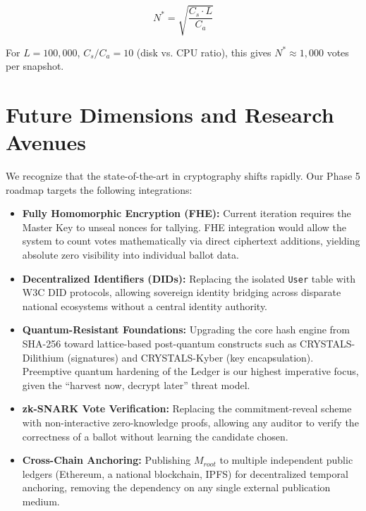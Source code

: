 \documentclass[journal,10pt,twocolumn]{IEEEtran}
\begin{document}
\begin{equation}
    N^* = \sqrt{\frac{C_s \cdot L}{C_a}}
\end{equation}

For $L = 100,000$, $C_s/C_a = 10$ (disk vs. CPU ratio), this gives $N^* \approx 1,000$ votes per snapshot.

\section{Future Dimensions and Research Avenues}

We recognize that the state-of-the-art in cryptography shifts rapidly. Our Phase 5 roadmap targets the following integrations:

\begin{itemize}
    \item \textbf{Fully Homomorphic Encryption (FHE):} Current iteration requires the Master Key to unseal nonces for tallying. FHE integration would allow the system to count votes mathematically via direct ciphertext additions, yielding absolute zero visibility into individual ballot data.
    \item \textbf{Decentralized Identifiers (DIDs):} Replacing the isolated \texttt{User} table with W3C DID protocols, allowing sovereign identity bridging across disparate national ecosystems without a central identity authority.
    \item \textbf{Quantum-Resistant Foundations:} Upgrading the core hash engine from SHA-256 toward lattice-based post-quantum constructs such as CRYSTALS-Dilithium (signatures) and CRYSTALS-Kyber (key encapsulation). Preemptive quantum hardening of the Ledger is our highest imperative focus, given the ``harvest now, decrypt later'' threat model.
    \item \textbf{zk-SNARK Vote Verification:} Replacing the commitment-reveal scheme with non-interactive zero-knowledge proofs, allowing any auditor to verify the correctness of a ballot without learning the candidate chosen.
    \item \textbf{Cross-Chain Anchoring:} Publishing $M_{root}$ to multiple independent public ledgers (Ethereum, a national blockchain, IPFS) for decentralized temporal anchoring, removing the dependency on any single external publication medium.
\end{itemize}
\end{document}
